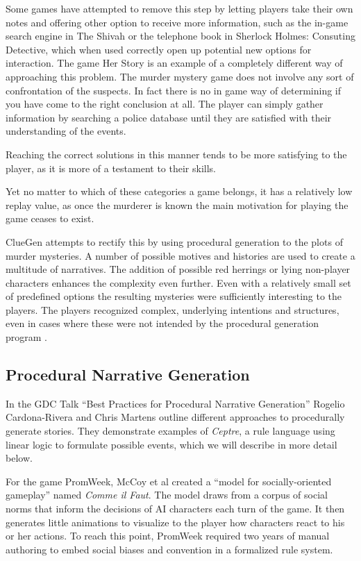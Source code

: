 Some games have attempted to remove this step by letting players take their own notes and offering other option to receive more information, such as the in-game search engine in The Shivah or the telephone book in Sherlock Holmes: Consuting Detective, which when used correctly open up potential new options for interaction.
The game Her Story is an example of a completely different way of approaching this problem.
The murder mystery game does not involve any sort of confrontation of the suspects.
In fact there is no in game way of determining if you have come to the right conclusion at all.
The player can simply gather information by searching a police database until they are satisfied with their understanding of the events.

Reaching the correct solutions in this manner tends to be more satisfying to the player, as it is more of a testament to their skills.

Yet no matter to which of these categories a game belongs, it has a relatively low replay value, as once the murderer is known the main motivation for playing the game ceases to exist.

ClueGen attempts to rectify this by using procedural generation to the plots of murder mysteries.
A number of possible motives and histories are used to create a multitude of narratives.
The addition of possible red herrings or lying non-player characters enhances the complexity even further.
Even with a relatively small set of predefined options the resulting mysteries were sufficiently interesting to the players.
The players recognized complex, underlying intentions and structures, even in cases where these were not intended by the procedural generation program \cite{AIIDE1614070}.

\subsection{Procedural Narrative Generation}

In the GDC Talk \enquote{Best Practices for Procedural Narrative Generation} Rogelio Cardona-Rivera and Chris Martens outline different approaches to procedurally generate stories.
They demonstrate examples of \emph{Ceptre}, a rule language using linear logic to formulate possible events, which we will describe in more detail below.

For the game PromWeek, McCoy et al created a \enquote{model for socially-oriented gameplay} named \emph{Comme il Faut}.
The model draws from a corpus of social norms that inform the decisions of AI characters each turn of the game.
It then generates little animations to visualize to the player how characters react to his or her actions.
To reach this point, PromWeek required two years of manual authoring to embed social biases and convention in a formalized rule system. 

